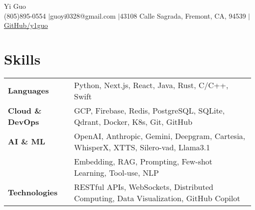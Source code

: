 \documentclass[letterpaper,12pt]{article}
\begin{document}
\newcommand{\name}{Yi Guo}
\newcommand{\phone}{(805)895-0554}
\newcommand{\email}{guoyi0328@gmail.com}
\newcommand{\address}{43108 Calle Sagrada, Fremont, CA, 94539}
\newcommand{\github}{y1guo}
\newcommand{\linkedin}{y1guo}
\newcommand{\website}{https://y1guo.github.io}

\begin{center}
    \Huge \name \\
    \vspace{1pt}
    \small \phone 
    $|$\email
    $|$\address
    $|$\href{https://github.com/\github}{GitHub/\github}
    \vspace{-10pt}
\end{center}





\vspace{-0.9em}
\section{Skills}
\vspace{0.3em}

\begin{tabular}{p{8em} p{37em}}
    \textbf{Languages}
    & Python, Next.js, React, Java, Rust, C/C++, Swift \\
    \textbf{Cloud \& DevOps}
    & GCP, Firebase, Redis, PostgreSQL, SQLite, Qdrant, Docker, K8s, Git, GitHub \\
    \textbf{AI \& ML}
    & OpenAI, Anthropic, Gemini, Deepgram, Cartesia, WhisperX, XTTS, Silero-vad, Llama3.1 \\
    & Embedding, RAG, Prompting, Few-shot Learning, Tool-use, NLP \\
    \textbf{Technologies}
    & RESTful APIs, WebSockets, Distributed Computing, Data Visualization, GitHub Copilot \\
\end{tabular}
\end{document}
